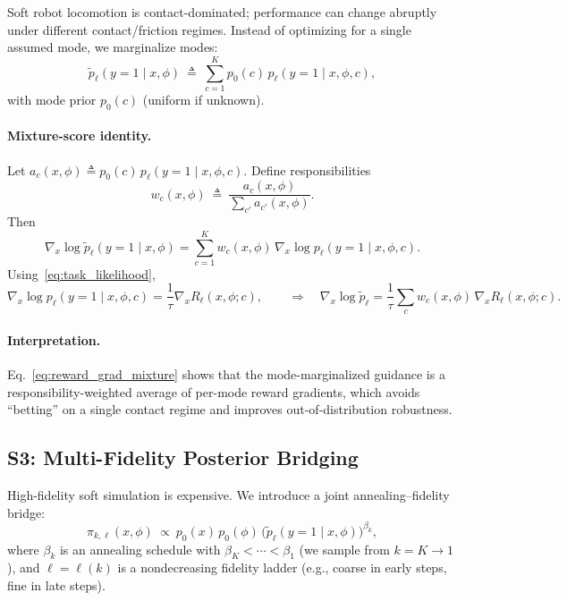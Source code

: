 Soft robot locomotion is contact-dominated; performance can change abruptly under different
contact/friction regimes. Instead of optimizing for a single assumed mode, we marginalize modes:
\begin{equation}
\tilde p_{\ell}(y=1 \mid x,\phi)
~\triangleq~
\sum_{c=1}^{K} p_0(c)\, p_{\ell}(y=1\mid x,\phi,c),
\label{eq:mode_marginal_likelihood}
\end{equation}
with mode prior $p_0(c)$ (uniform if unknown).

\paragraph{Mixture-score identity.}
Let $a_c(x,\phi)\triangleq p_0(c)\,p_{\ell}(y=1\mid x,\phi,c)$.
Define responsibilities
\begin{equation}
w_c(x,\phi)
~\triangleq~
\frac{a_c(x,\phi)}{\sum_{c'}a_{c'}(x,\phi)}.
\label{eq:responsibility}
\end{equation}
Then
\begin{equation}
\nabla_x \log \tilde p_{\ell}(y=1 \mid x,\phi)
=
\sum_{c=1}^K w_c(x,\phi)\, \nabla_x \log p_{\ell}(y=1\mid x,\phi,c).
\label{eq:mixture_score}
\end{equation}
Using~\eqref{eq:task_likelihood},
\begin{equation}
\nabla_x \log p_{\ell}(y=1\mid x,\phi,c)
=
\frac{1}{\tau}\nabla_x R_{\ell}(x,\phi;c),
\qquad
\Rightarrow\quad
\nabla_x \log \tilde p_{\ell}
=
\frac{1}{\tau}\sum_c w_c(x,\phi)\,\nabla_x R_{\ell}(x,\phi;c).
\label{eq:reward_grad_mixture}
\end{equation}

\paragraph{Interpretation.}
Eq.~\eqref{eq:reward_grad_mixture} shows that the mode-marginalized guidance is a
responsibility-weighted average of per-mode reward gradients, which avoids ``betting'' on a single
contact regime and improves out-of-distribution robustness.

\subsection{S3: Multi-Fidelity Posterior Bridging}
\label{subsec:s3}

High-fidelity soft simulation is expensive. We introduce a joint annealing--fidelity bridge:
\begin{equation}
\pi_{k,\ell}(x,\phi)
~\propto~
p_0(x)\,p_0(\phi)\,
\Big(\tilde p_{\ell}(y=1\mid x,\phi)\Big)^{\beta_k},
\label{eq:bridge_dist}
\end{equation}
where $\beta_k$ is an annealing schedule with $\beta_K < \cdots < \beta_1$
(we sample from $k=K\to 1$), and $\ell=\ell(k)$ is a nondecreasing fidelity ladder
(e.g., coarse in early steps, fine in late steps).

